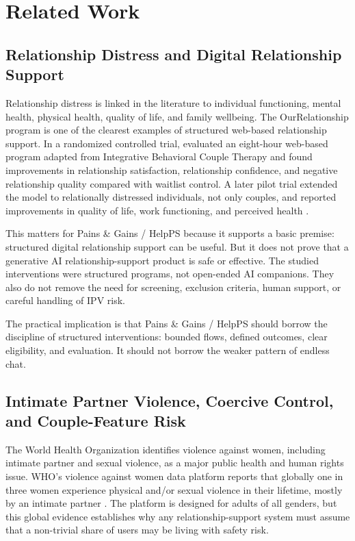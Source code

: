 \documentclass[11pt]{article}
\begin{document}
\section{Related Work}

\subsection{Relationship Distress and Digital Relationship Support}

Relationship distress is linked in the literature to individual functioning, mental health, physical health, quality of life, and family wellbeing. The OurRelationship program is one of the clearest examples of structured web-based relationship support. In a randomized controlled trial, \citet{doss2016} evaluated an eight-hour web-based program adapted from Integrative Behavioral Couple Therapy and found improvements in relationship satisfaction, relationship confidence, and negative relationship quality compared with waitlist control. A later pilot trial extended the model to relationally distressed individuals, not only couples, and reported improvements in quality of life, work functioning, and perceived health \citep{nowlan2017}.

This matters for Pains \& Gains / HelpPS because it supports a basic premise: structured digital relationship support can be useful. But it does not prove that a generative AI relationship-support product is safe or effective. The studied interventions were structured programs, not open-ended AI companions. They also do not remove the need for screening, exclusion criteria, human support, or careful handling of IPV risk.

The practical implication is that Pains \& Gains / HelpPS should borrow the discipline of structured interventions: bounded flows, defined outcomes, clear eligibility, and evaluation. It should not borrow the weaker pattern of endless chat.

\subsection{Intimate Partner Violence, Coercive Control, and Couple-Feature Risk}

The World Health Organization identifies violence against women, including intimate partner and sexual violence, as a major public health and human rights issue. WHO's violence against women data platform reports that globally one in three women experience physical and/or sexual violence in their lifetime, mostly by an intimate partner \citep{whoVAW}. The platform is designed for adults of all genders, but this global evidence establishes why any relationship-support system must assume that a non-trivial share of users may be living with safety risk.
\end{document}
